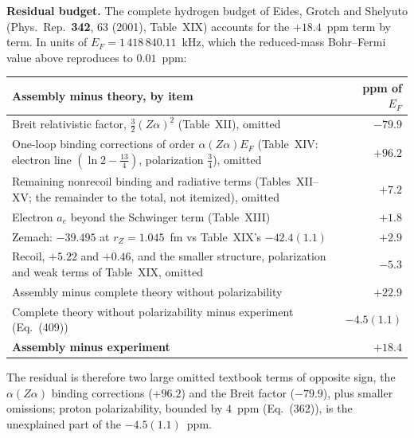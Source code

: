 \documentclass[11pt]{article}
\begin{document}
\textbf{Residual budget.}  The complete hydrogen budget of Eides,
Grotch and Shelyuto (Phys.\ Rep.\ \textbf{342}, 63 (2001), Table~XIX)
accounts for the $+18.4$~ppm term by term.  In units of
$E_F = 1\,418\,840.11$~kHz, which the reduced-mass Bohr--Fermi value
above reproduces to $0.01$~ppm:
\begin{center}\small
\begin{tabular}{p{8.6cm} r}
\toprule
Assembly minus theory, by item & ppm of $E_F$ \\
\midrule
Breit relativistic factor, $\tfrac32(Z\alpha)^2$ (Table~XII), omitted & $-79.9$ \\
One-loop binding corrections of order $\alpha(Z\alpha)E_F$ (Table~XIV:
electron line $(\ln 2 - \tfrac{13}{4})$, polarization $\tfrac34$), omitted & $+96.2$ \\
Remaining nonrecoil binding and radiative terms (Tables~XII--XV; the
remainder to the total, not itemized), omitted & $+7.2$ \\
Electron $a_e$ beyond the Schwinger term (Table~XIII) & $+1.8$ \\
Zemach: $-39.495$ at $r_Z = 1.045$~fm vs Table~XIX's $-42.4(1.1)$ & $+2.9$ \\
Recoil, $+5.22$ and $+0.46$, and the smaller structure, polarization and
weak terms of Table~XIX, omitted & $-5.3$ \\
\midrule
Assembly minus complete theory without polarizability & $+22.9$ \\
Complete theory without polarizability minus experiment (Eq.~(409)) & $-4.5(1.1)$ \\
\midrule
\textbf{Assembly minus experiment} & $\mathbf{+18.4}$ \\
\bottomrule
\end{tabular}
\end{center}
The residual is therefore two large omitted textbook terms of opposite
sign, the $\alpha(Z\alpha)$ binding corrections ($+96.2$) and the Breit
factor ($-79.9$), plus smaller omissions; proton polarizability,
bounded by $4$~ppm (Eq.~(362)), is the unexplained part of the
$-4.5(1.1)$~ppm.
\end{document}

